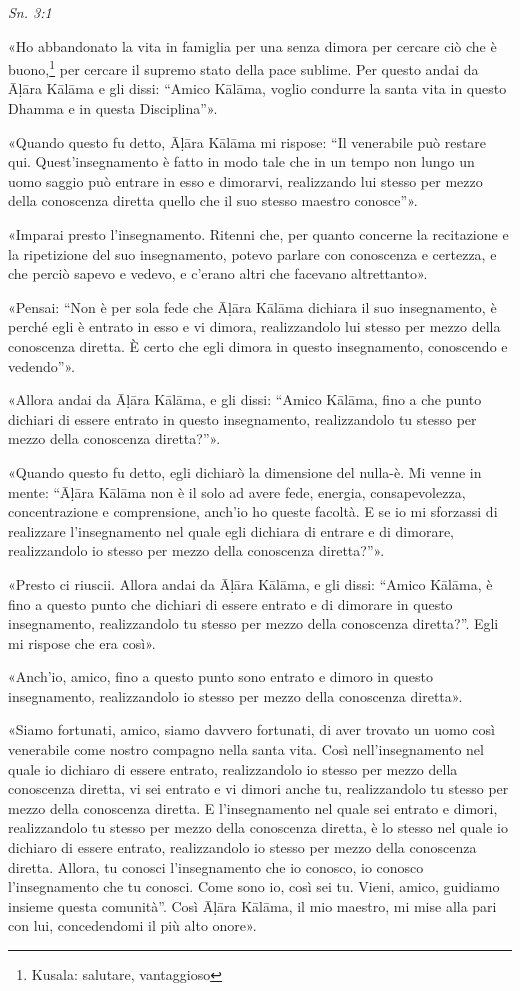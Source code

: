 \emph{Sn. 3:1}


 «Ho abbandonato la vita in famiglia per una senza dimora per
cercare ciò che è buono,\footnote{Kusala: salutare, vantaggioso} per cercare
il supremo stato della pace sublime. Per questo andai da Āḷāra Kālāma e gli dissi: “Amico
Kālāma, voglio condurre la santa vita in questo Dhamma e in questa
Disciplina”».


«Quando questo fu detto, Āḷāra Kālāma mi rispose: “Il venerabile può
restare qui. Quest’insegnamento è fatto in modo tale che in un tempo non
lungo un uomo saggio può entrare in esso e dimorarvi, realizzando lui
stesso per mezzo della conoscenza diretta quello che il suo stesso
maestro conosce”».


«Imparai presto l’insegnamento. Ritenni che, per quanto concerne la
recitazione e la ripetizione del suo insegnamento, potevo parlare con
conoscenza e certezza, e che perciò sapevo e vedevo, e c’erano altri che
facevano altrettanto».


«Pensai: “Non è per sola fede che Āḷāra Kālāma dichiara il suo
insegnamento, è perché egli è entrato in esso e vi dimora, realizzandolo
lui stesso per mezzo della conoscenza diretta. È certo che egli dimora
in questo insegnamento, conoscendo e vedendo”».


«Allora andai da Āḷāra Kālāma, e gli dissi: “Amico Kālāma, fino a che
punto dichiari di essere entrato in questo insegnamento, realizzandolo
tu stesso per mezzo della conoscenza diretta?”».


«Quando questo fu detto, egli dichiarò la dimensione del nulla-è. Mi
venne in mente: “Āḷāra Kālāma non è il solo ad avere fede, energia,
consapevolezza, concentrazione e comprensione, anch’io ho queste
facoltà. E se io mi sforzassi di realizzare l’insegnamento nel quale
egli dichiara di entrare e di dimorare, realizzandolo io stesso per
mezzo della conoscenza diretta?”».


«Presto ci riuscii. Allora andai da Āḷāra Kālāma, e gli dissi: “Amico
Kālāma, è fino a questo punto che dichiari di essere entrato e di
dimorare in questo insegnamento, realizzandolo tu stesso per mezzo della
conoscenza diretta?”. Egli mi rispose che era così».


«Anch’io, amico, fino a questo punto sono entrato e dimoro in questo
insegnamento, realizzandolo io stesso per mezzo della conoscenza
diretta».


«Siamo fortunati, amico, siamo davvero fortunati, di aver trovato un
uomo così venerabile come nostro compagno nella santa vita. Così
nell’insegnamento nel quale io dichiaro di essere entrato, realizzandolo
io stesso per mezzo della conoscenza diretta, vi sei entrato e vi dimori
anche tu, realizzandolo tu stesso per mezzo della conoscenza diretta. E
l’insegnamento nel quale sei entrato e dimori, realizzandolo tu stesso
per mezzo della conoscenza diretta, è lo stesso nel quale io dichiaro di
essere entrato, realizzandolo io stesso per mezzo della conoscenza
diretta. Allora, tu conosci l’insegnamento che io conosco, io conosco
l’insegnamento che tu conosci. Come sono io, così sei tu. Vieni, amico,
guidiamo insieme questa comunità”. Così Āḷāra Kālāma, il mio maestro, mi
mise alla pari con lui, concedendomi il più alto onore».


